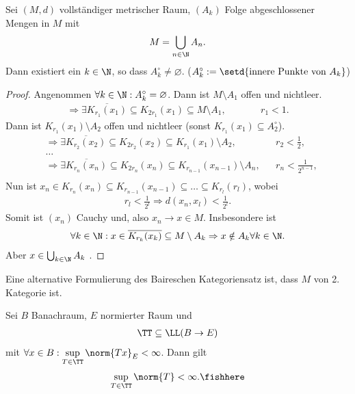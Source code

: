 \begin{prop}
\label{prop:3.5}
Sei $(M,d)$ vollständiger metrischer Raum, $(A_k)$ Folge abgeschlossener Mengen
in $M$ mit
\begin{align*}
M= \bigcup_{n\in\N} A_n.
\end{align*}
Dann existiert ein $k\in\N$, so dass $A_k^\circ \neq \varnothing$.
($A_k^\circ:=\setd{\text{innere Punkte von }A_k}$)\fishhere
\end{prop}
\begin{proof}
Angenommen $\forall k\in \N : A_k^\circ = \varnothing$. Dann ist $M\setminus
A_1$ offen und nichtleer.
\begin{align*}
\Rightarrow \exists \overline{K_{r_1}(x_1)} \subseteq K_{2r_1}(x_1) \subseteq
M\setminus A_1,\qquad && r_1 < 1.
\end{align*}
Dann ist $K_{r_1}(x_1)\setminus A_2$ offen und nichtleer (sonst
$K_{r_1}(x_1)\subseteq A_2^\circ$).
\begin{align*}
&\Rightarrow \exists \overline{K_{r_2}(x_2)}\subseteq K_{2r_2}(x_2)\subseteq
K_{r_1}(x_1)\setminus A_2, && r_2< \frac{1}{2},\\
&\ldots\\
&\Rightarrow \exists \overline{K_{r_n}(x_n)}\subseteq K_{2r_n}(x_n)\subseteq
K_{r_{n-1}}(x_{n-1})\setminus A_{n}, && r_n< \frac{1}{2^{n-1}},\\
\end{align*}
Nun ist $x_n\in K_{r_n}(x_n)\subseteq K_{r_{n-1}}(x_{n-1})\subseteq \ldots
\subseteq K_{r_l}(r_l)$, wobei
\begin{align*}
r_l < \frac{1}{2^l} \Rightarrow d(x_n,x_l) < \frac{1}{2^l}.
\end{align*}
Somit ist $(x_n)$ Cauchy und, also $x_n\to x\in M$. Insbesondere ist
\begin{align*}
\forall k\in \N : x\in \overline{K_{r_k}(x_k)}\subseteq M\setminus A_k
\Rightarrow x\notin A_k\forall k\in\N.
\end{align*}
Aber $x\in\bigcup_{k\in\N}A_k$ \dipper.\qedhere
\end{proof}

\begin{bem}
\label{bem:3.6}
Eine alternative Formulierung des Baireschen Kategoriensatz ist, dass $M$ von
2. Kategorie ist.\maphere
\end{bem}

\begin{prop}
\label{prop:3.7}
Sei $B$ Banachraum, $E$ normierter Raum und
\begin{align*}
\TT\subseteq \LL(B\to E)
\end{align*}
mit $\forall x\in B: \sup\limits_{T\in\TT}\norm{Tx}_E<\infty$. Dann gilt
\begin{align*}
\sup\limits_{T\in\TT}\norm{T} <\infty.\fishhere
\end{align*}
\end{prop}

